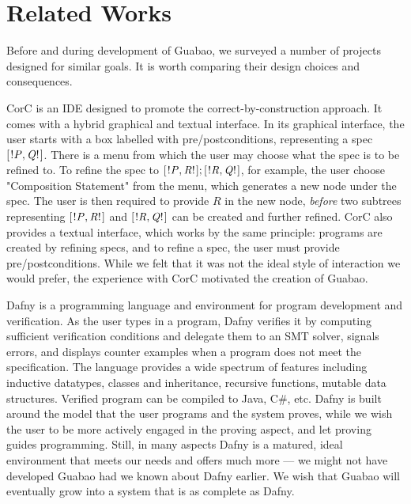 \documentclass[runningheads]{llncs}
\newcommand{\Conid}[1]{\mathit{#1}}
\let\Conid\mathit
\begin{document}
\section{Related Works}

Before and during development of Guabao, we surveyed a number of projects designed for similar goals.
It is worth comparing their design choices and consequences.

CorC \cite{Schaefer:18:CorC,Runge:19:Tool} is an IDE designed to promote the correct-by-construction approach.
It comes with a hybrid graphical and textual interface.
In its graphical interface, the user starts with a box labelled with pre/postconditions, representing a spec \ensuremath{[\mskip1.5mu \mathbin{!}\Conid{P},\Conid{Q}\mathbin{!}\mskip1.5mu]}.
There is a menu from which the user may choose what the spec is to be refined to.
To refine the spec to \ensuremath{[\mskip1.5mu \mathbin{!}\Conid{P},\Conid{R}\mathbin{!}\mskip1.5mu];[\mskip1.5mu \mathbin{!}\Conid{R},\Conid{Q}\mathbin{!}\mskip1.5mu]}, for example, the user choose "Composition Statement" from the menu, which generates a new node under the spec.
The user is then required to provide \ensuremath{\Conid{R}} in the new node, \emph{before} two subtrees representing \ensuremath{[\mskip1.5mu \mathbin{!}\Conid{P},\Conid{R}\mathbin{!}\mskip1.5mu]} and \ensuremath{[\mskip1.5mu \mathbin{!}\Conid{R},\Conid{Q}\mathbin{!}\mskip1.5mu]} can be created and further refined.
CorC also provides a textual interface, which works by the same principle:
programs are created by refining specs,
and to refine a spec, the user must provide pre/postconditions.
While we felt that it was not the ideal style of interaction we would prefer,
the experience with CorC motivated the creation of Guabao.

Dafny \cite{Leino:14:Dafny} is a programming language and environment for program development and verification.
As the user types in a program, Dafny verifies it by computing sufficient verification conditions and delegate them to an SMT solver, signals errors, and displays counter examples when a program does not meet the specification.
The language provides a wide spectrum of features including
inductive datatypes, classes and inheritance, recursive functions, mutable data structures.
Verified program can be compiled to Java, C#, etc.
Dafny is built around the model that the user programs and the system proves,
while we wish the user to be more actively engaged in the proving aspect, and let proving guides programming.
Still, in many aspects Dafny is a matured, ideal environment that meets our needs and offers much more --- we might not have developed Guabao had we known about Dafny earlier.
We wish that Guabao will eventually grow into a system that is as complete as Dafny.
\end{document}
